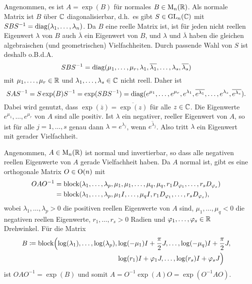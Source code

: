 \documentclass[a4paper, 10pt, numbers=noenddot]{scrartcl}
\begin{document}
\subsection{}

Angenommen, es ist $A = \exp(B)$ für normales $B \in \operatorname{M}_n(\mathbb{R})$.
Als normale Matrix ist $B$ über $\mathbb{C}$ diagonalisierbar, d.h.\ es gibt $S \in \operatorname{GL}_n(\mathbb{C})$ mit $S B S^{-1} = \operatorname{\operatorname{diag}}(\lambda_1, \dotsc, \lambda_n)$.
Da $B$ eine reelle Matrix ist, ist für jeden nicht reellen Eigenwert $\lambda$ von $B$ auch $\overline{\lambda}$ ein Eigenwert von $B$, und $\lambda$ und $\overline{\lambda}$ haben die gleichen algebraischen (und geometrischen) Vielfachheiten.
Durch passende Wahl von $S$ ist deshalb o.B.d.A.
\[
    S B S^{-1}
  = \operatorname{\operatorname{diag}}(\mu_1, \dotsc, \mu_r, \lambda_1, \overline{\lambda_1}, \dotsc, \lambda_s, \overline{\lambda_s})
\]
mit $\mu_1, \dotsc, \mu_r \in \mathbb{R}$ und $\lambda_1, \dotsc, \lambda_s \in \mathbb{C}$ nicht reell.
Daher ist
\[
    S A S^{-1}
  = S \exp(B) S^{-1}
  = \exp(S B S^{-1})
  = \operatorname{\operatorname{diag}}(e^{\mu_1}, \dotsc, e^{\mu_r},
          e^{\lambda_1}, \overline{e^{\lambda_1}}, \dotsc, e^{\lambda_s}, \overline{e^{\lambda_s}}).
\]
Dabei wird genutzt, dass $\exp(\overline{z}) = \overline{\exp(z)}$ für alle $z \in \mathbb{C}$.
Die Eigenwerte $e^{\mu_1}, \dotsc, e^{\mu_r}$ von $A$ sind alle positiv.
Ist $\lambda$ ein negativer, reeller Eigenwert von $A$, so ist für alle $j = 1, \dotsc, s$ genau dann $\lambda = e^{\lambda_j}$, wenn $\overline{e^{\lambda_j}}$.
Also tritt $\lambda$ ein Eigenwert mit gerader Vielfachheit.

Angenommen, $A \in \operatorname{M}_n(\mathbb{R})$ ist normal und invertierbar, so dass alle negativen reellen Eigenwerte von $A$ gerade Vielfachheit haben.
Da $A$ normal ist, gibt es eine orthogonale Matrix $O \in \operatorname{O}(n)$ mit
\begin{align*}
      O A O^{-1}
  &=  \operatorname{\operatorname{block}}( \lambda_1, \dotsc, \lambda_p,
              \mu_1, \mu_1, \dotsc, \mu_q, \mu_q,
              r_1 D_{\varphi_1}, \dotsc, r_s D_{\varphi_s}  ) \\
  &=  \operatorname{\operatorname{block}}( \lambda_1, \dotsc, \lambda_p,
              \mu_1 I, \dotsc, \mu_q I,
              r_1 D_{\varphi_1}, \dotsc, r_s D_{\varphi_s}  ),
\end{align*}
wobei $\lambda_1, \dotsc, \lambda_p > 0$ die positiven reellen Eigenwerte von $A$ sind, $\mu_1, \dotsc, \mu_q < 0$ die negativen reellen Eigenwerte, $r_1, \dotsc, r_s > 0$ Radien und $\varphi_1, \dotsc, \varphi_s \in \mathbb{R}$ Drehwinkel.
Für die Matrix
\begin{align*}
  B
  \coloneqq \operatorname{\operatorname{block}}\Bigl(  \log(\lambda_1), \dotsc, \log(\lambda_p),
                         &\log(-\mu_1) I + \frac{\pi}{2} J, \dotsc, \log(-\mu_q) I + \frac{\pi}{2} J, \\
                         &\log(r_1) I + \varphi_1 J, \dotsc, \log(r_s) I + \varphi_s J                \Bigr)
\end{align*}
ist $O A O^{-1} = \exp(B)$ und somit $A = O^{-1} \exp(A) O = \exp(O^{-1} A O)$.
\end{document}
